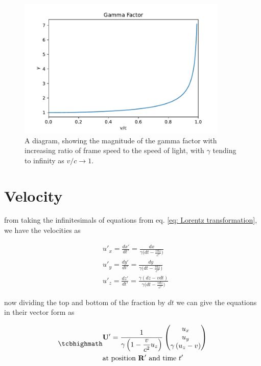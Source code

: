 \begin{figure}[H]
	\centering
	\includegraphics[width=10cm]{images/pdf/Gamma_Factor.pdf}
	\caption{A diagram, showing the magnitude of the gamma factor with increasing ratio of frame speed to the speed of light, with ${\gamma}$ tending to infinity as $v/c\rightarrow 1$.}
	\label{fig: Gamma Factor}
\end{figure}

\section{Velocity}

from taking the infinitesimals of equations from eq. \eqref{eq: Lorentz transformation}, we have the velocities as

\begin{equation}
	\begin{aligned}
		 & u'_x = \frac{dx'}{dt'}=\frac{dx}{{\gamma} \bigg(dt-\frac{vdz}{c^2}\bigg) }                  \\
		 & u'_y = \frac{dy'}{dt'}=\frac{dy}{{\gamma} \bigg(dt-\frac{vdz}{c^2}\bigg) }                  \\
		 & u'_z = \frac{dz'}{dt'} = \frac{{\gamma} (dz-vdt)}{{\gamma} \bigg(dt-\frac{vdz}{c^2}\bigg) }
	\end{aligned}
\end{equation}

now dividing the top and bottom of the fraction by $dt$ we can give the equations in their vector form as

\begin{equation}
	\label{eq: velocity transform}
	\mhl{
		\begin{aligned}
			 & \mathbf{U}' = \dfrac{1}{{\gamma}\left(1- \dfrac{v}{c^2} u_z\right) }
			\begin{pmatrix}
				u_x                             \\
				u_y                             \\
				{\gamma} \left( u_z - v \right) \\
			\end{pmatrix}
			\\
			 & \text{at position $\mathbf{R}'$ and time $t'$ }
		\end{aligned}
	}
\end{equation}

